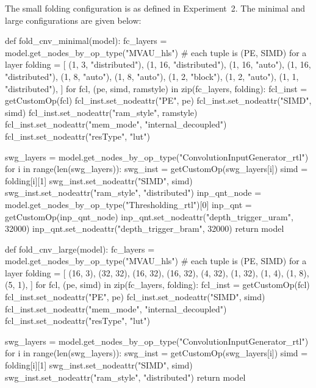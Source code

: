 \documentclass[11pt]{article}
\begin{document}
The small folding configuration is as defined in Experiment~2. The minimal and large configurations are given below:
\begin{jupytercell}
def fold_cnv_minimal(model):
    fc_layers = model.get_nodes_by_op_type("MVAU_hls")
    # each tuple is (PE, SIMD) for a layer
    folding = [
        (1, 3, "distributed"),
        (1, 16, "distributed"),
        (1, 16, "auto"),
        (1, 16, "distributed"),
        (1, 8, "auto"),
        (1, 8, "auto"),
        (1, 2, "block"),
        (1, 2, "auto"),
        (1, 1, "distributed"),
    ]
    for fcl, (pe, simd, ramstyle) in zip(fc_layers, folding):
        fcl_inst = getCustomOp(fcl)
        fcl_inst.set_nodeattr("PE", pe)
        fcl_inst.set_nodeattr("SIMD", simd)
        fcl_inst.set_nodeattr("ram_style", ramstyle)
        fcl_inst.set_nodeattr("mem_mode", "internal_decoupled")
        fcl_inst.set_nodeattr("resType", "lut")

    swg_layers = model.get_nodes_by_op_type("ConvolutionInputGenerator_rtl")
    for i in range(len(swg_layers)):
        swg_inst = getCustomOp(swg_layers[i])
        simd = folding[i][1]
        swg_inst.set_nodeattr("SIMD", simd)
        swg_inst.set_nodeattr("ram_style", "distributed")
    inp_qnt_node = model.get_nodes_by_op_type("Thresholding_rtl")[0]
    inp_qnt = getCustomOp(inp_qnt_node)
    inp_qnt.set_nodeattr("depth_trigger_uram", 32000)
    inp_qnt.set_nodeattr("depth_trigger_bram", 32000)
    return model
\end{jupytercell}
\begin{jupytercell}
def fold_cnv_large(model):
    fc_layers = model.get_nodes_by_op_type("MVAU_hls")
    # each tuple is (PE, SIMD) for a layer
    folding = [
        (16, 3),
        (32, 32),
        (16, 32),
        (16, 32),
        (4, 32),
        (1, 32),
        (1, 4),
        (1, 8),
        (5, 1),
    ]
    for fcl, (pe, simd) in zip(fc_layers, folding):
        fcl_inst = getCustomOp(fcl)
        fcl_inst.set_nodeattr("PE", pe)
        fcl_inst.set_nodeattr("SIMD", simd)
        fcl_inst.set_nodeattr("mem_mode", "internal_decoupled")
        fcl_inst.set_nodeattr("resType", "lut")

    swg_layers = model.get_nodes_by_op_type("ConvolutionInputGenerator_rtl")
    for i in range(len(swg_layers)):
        swg_inst = getCustomOp(swg_layers[i])
        simd = folding[i][1]
        swg_inst.set_nodeattr("SIMD", simd)
        swg_inst.set_nodeattr("ram_style", "distributed")
    return model
\end{jupytercell}
\end{document}
